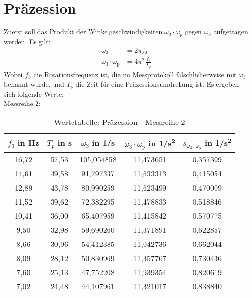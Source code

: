 \newpage
\section{Präzession}
Zuerst soll das Produkt der Winkelgeschwindigkeiten \(\omega_3 \cdot \omega_\text{p}\) gegen \(\omega_3\) aufgetragen werden.
Es gilt:
\begin{align}
    \omega_3 &= 2\pi f_3 \\
    \omega_3 \cdot \omega_\text{p} &= 4 \pi^2 \, \frac{f_3}{T_\text{p}}
\end{align}
Wobei \(f_3\) die Rotationsfrequenz ist, die im Messprotokoll fälschlicherweise mit \(\omega_3 \) benannt wurde, und \(T_\text{p}\) die Zeit für eine Präzessionsumdrehung ist.
Es ergeben sich folgende Werte:\\
Messreihe 2:\\
\begin{table}[h]
    \centering
    \begin{tabular}{c|c|c|c|c}
            \(f_3\) in Hz & \(T_p\) in s & \(\omega_3\) in 1/s & \(\omega_3 \cdot \omega_\text{p}\) in 1/s\textsuperscript{2} &   \(s_{\omega_3 \cdot \omega_\text{p}}\) in 1/s\textsuperscript{2} \\
            \hline
            16,72 &  57,53 &  105,054858 &  11,473651 &  0,357309 \\
            14,61 &  49,58 &   91,797337 &  11,633313 &  0,415054 \\
            12,89 &  43,78 &   80,990259 &  11,623499 &  0,470009 \\
            11,52 &  39,62 &   72,382295 &  11,478833 &  0,518846 \\
            10,41 &  36,00 &   65,407959 &  11,415842 &  0,570775 \\
             9,50 &  32,98 &   59,690260 &  11,371891 &  0,622857 \\
             8,66 &  30,96 &   54,412385 &  11,042736 &  0,662044 \\
             8,09 &  28,12 &   50,830969 &  11,357767 &  0,730436 \\
             7,60 &  25,13 &   47,752208 &  11,939354 &  0,820619 \\
             7,02 &  24,48 &   44,107961 &  11,321017 &  0,838840 \\
        \end{tabular}
        \caption{Wertetabelle: Präzession - Messreihe 2}
\end{table}

